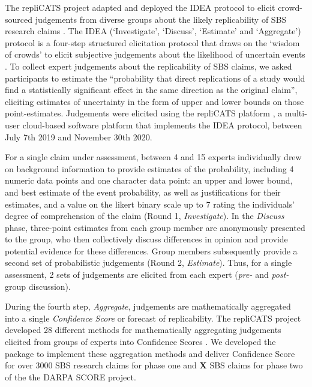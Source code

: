 \documentclass[article]{jss}
\begin{document}
The repliCATS project adapted and deployed the IDEA protocol to elicit
crowd-sourced judgements from diverse groups about the likely
replicability of SBS research claims \citep{Fraser:2021}. The IDEA
(`Investigate', `Discuss', `Estimate' and `Aggregate') protocol is a
four-step structured elicitation protocol that draws on the `wisdom of
crowds' to elicit subjective judgements about the likelihood of
uncertain events \citep[figure 1]{hemming2017}. To collect expert
judgements about the replicability of SBS claims, we asked participants
to estimate the ``probability that direct replications of a study would
find a statistically significant effect in the same direction as the
original claim'', eliciting estimates of uncertainty in the form of
upper and lower bounds on those point-estimates. Judgements were
elicited using the repliCATS platform \citep{Pearson2021}, a multi-user
cloud-based software platform that implements the IDEA protocol, between
July 7th 2019 and November 30th 2020.

For a single claim under assessment, between 4 and 15 experts
individually drew on background information to provide estimates of the
probability, including 4 numeric data points and one character data
point: an upper and lower bound, and best estimate of the event
probability, as well as justifications for their estimates, and a value
on the likert binary scale up to 7 rating the individuals' degree of
comprehension of the claim (Round 1, \emph{Investigate}). In the
\emph{Discuss} phase, three-point estimates from each group member are
anonymously presented to the group, who then collectively discuss
differences in opinion and provide potential evidence for these
differences. Group members subsequently provide a second set of
probabilistic judgements (Round 2, \emph{Estimate}). Thus, for a single
assessment, 2 sets of judgements are elicited from each expert
(\emph{pre-} and \emph{post-}group discussion).

During the fourth step, \emph{Aggregate}, judgements are mathematically
aggregated into a single \emph{Confidence Score} or forecast of
replicability. The repliCATS project developed 28 different methods for
mathematically aggregating judgements elicited from groups of experts
into Confidence Scores \citep{Hanea2021}. We developed the
 package to implement these aggregation methods and
deliver Confidence Score for over 3000 SBS research claims for phase one
and \textbf{X} SBS claims for phase two of the the DARPA SCORE project.
\end{document}
